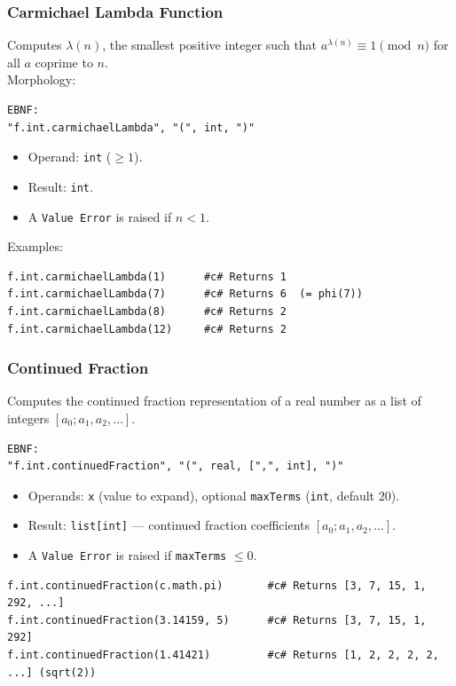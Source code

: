 \subsubsection{Carmichael Lambda Function}
Computes $\lambda(n)$, the smallest positive integer such that $a^{\lambda(n)} \equiv 1 \pmod{n}$ for all $a$ coprime to $n$. \\
Morphology:
\begin{verbatim}
EBNF:
"f.int.carmichaelLambda", "(", int, ")"
\end{verbatim}
\begin{itemize}
\item Operand: \texttt{int} ($\geq 1$).
\item Result: \texttt{int}.
\item A \texttt{Value Error} is raised if $n < 1$.
\end{itemize}
Examples:
\begin{verbatim}
f.int.carmichaelLambda(1)      #c# Returns 1
f.int.carmichaelLambda(7)      #c# Returns 6  (= phi(7))
f.int.carmichaelLambda(8)      #c# Returns 2
f.int.carmichaelLambda(12)     #c# Returns 2
\end{verbatim}

\subsubsection{Continued Fraction}
Computes the continued fraction representation of a real number as a list of integers $[a_0; a_1, a_2, \ldots]$.
\begin{verbatim}
EBNF:
"f.int.continuedFraction", "(", real, [",", int], ")"
\end{verbatim}
\begin{itemize}
\item Operands: \texttt{x} (value to expand), optional \texttt{maxTerms} (\texttt{int}, default 20).
\item Result: \texttt{list[int]} --- continued fraction coefficients $[a_0; a_1, a_2, \ldots]$.
\item A \texttt{Value Error} is raised if \texttt{maxTerms} $\leq 0$.
\end{itemize}
\begin{verbatim}
f.int.continuedFraction(c.math.pi)       #c# Returns [3, 7, 15, 1, 292, ...]
f.int.continuedFraction(3.14159, 5)      #c# Returns [3, 7, 15, 1, 292]
f.int.continuedFraction(1.41421)         #c# Returns [1, 2, 2, 2, 2, ...] (sqrt(2))
\end{verbatim}


